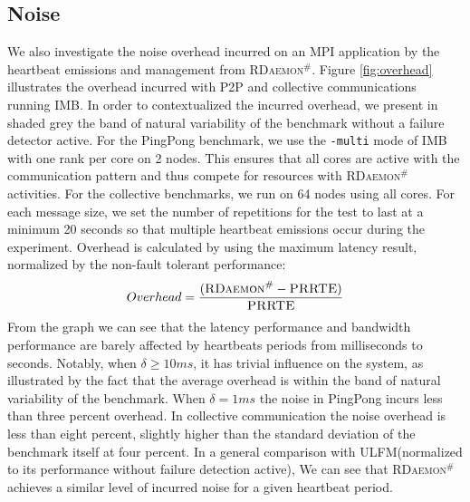 \documentclass[sigconf]{acmart}
\newcommand{\prrte}[0]{\textsc{PRRTE}\xspace}
\newcommand{\ulfm}[0]{\textsc{ULFM}\xspace}
\newcommand{\ourwork}[0]{\textsc{RDaemon}\ensuremath{^\#}\xspace}
\newcommand{\imb}[0]{\textsc{IMB}\xspace}
\begin{document}
\subsection{Noise}
We also investigate the noise overhead incurred on an MPI application by the heartbeat emissions
and management from \ourwork.
Figure \ref{fig:overhead} illustrates the overhead incurred with P2P and collective communications running \imb.
In order to contextualized the incurred overhead, we present in shaded grey the band of natural variability
of the benchmark without a failure detector active.
For the PingPong benchmark, we use the \texttt{-multi} mode of IMB with one rank per core on 2 nodes.
This ensures that all cores are active with the communication pattern and thus
compete for resources with \ourwork activities.
For the collective benchmarks, we run on 64 nodes using all cores. For each message size, we set the number of
repetitions for the test to last at a minimum 20 seconds so that multiple heartbeat emissions occur during the experiment. Overhead is calculated by using the maximum latency result, normalized by the non-fault tolerant performance:
\begin{equation}
Overhead = \frac{( {\ourwork - \prrte} )}{\prrte}
\end{equation}
 From the graph we can see that the latency performance and bandwidth performance are barely affected by heartbeats periods from milliseconds to seconds. Notably, when $ \delta \geq 10 ms $, it has trivial influence on the system, as illustrated by the fact that the average overhead is within the band of natural variability of the benchmark. When  $ \delta = 1 ms $ the noise in PingPong incurs less than three percent overhead. In collective communication the noise overhead is less than eight percent, slightly higher than the standard deviation of the benchmark itself at four percent.
 In a general comparison with \ulfm (normalized to its performance without failure detection active),
 We can see that \ourwork achieves a similar level of incurred noise for a given
 heartbeat period.
\end{document}

